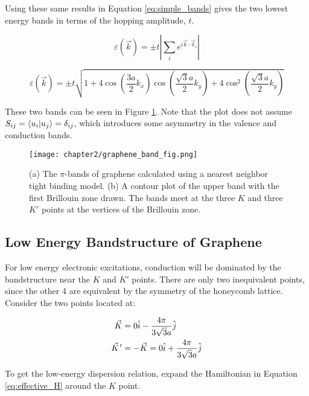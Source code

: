 Using these same results in Equation \ref{eq:simple_bands} gives the two lowest energy bands in terms of the hopping amplitude, $t$. 

\begin{equation}
    \varepsilon(\vec{k}) = \pm t \left| \sum_{i}^{} e^{i \vec{k}\cdot\vec{\delta}_i} \right|
    \label{eq:f_k}
\end{equation}

\begin{equation}
    \varepsilon(\vec{k}) = \pm t \sqrt{ 1 + 4\cos\left(\frac{3a}{2}k_x\right)\cos\left(\frac{\sqrt{3}a}{2}k_y\right) + 4\cos^{2}\left(\frac{\sqrt{3}a}{2}k_y\right)} \label{eq:bands}
\end{equation}    

These two bands can be seen in Figure \ref{fig:graphene_bands}. Note that the plot does not assume  $S_{ij} = \braket{u_i | u_j} = \delta_{ij}$, which introduces some asymmetry in the valence and conduction bands.

\begin{figure}
    \centering
    \texttt{[image: chapter2/graphene\_band\_fig.png]}
    \caption{(a) The $\pi$-bands of graphene calculated using a nearest neighbor tight binding model. (b) A contour plot of the upper band with the first Brillouin zone drawn. The bands meet at the three $K$ and three $K'$ points at the vertices of the Brillouin zone.}
    \label{fig:graphene_bands}
\end{figure}

\subsection{Low Energy Bandstructure of Graphene}

For low energy electronic excitations, conduction will be dominated by the bandstructure near the $K$ and $K'$ points. There are only two inequivalent points, since the other 4 are equivalent by the symmetry of the honeycomb lattice. Consider the two points located at:

\begin{align}
    \vec{K} &= 0\hat{i} - \frac{4\pi}{3\sqrt{3}a}\hat{j} \\
    \pvec{K}' &= -\vec{K} = 0\hat{i} + \frac{4\pi}{3\sqrt{3}a}\hat{j}
\end{align}

To get the low-energy dispersion relation, expand the Hamiltonian in Equation \ref{eq:effective_H} around the $K$ point.

